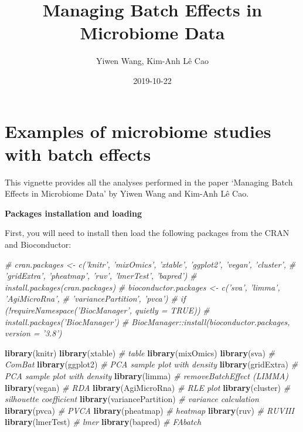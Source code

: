\documentclass[]{book}
\title{Managing Batch Effects in Microbiome Data}
\author{Yiwen Wang, Kim-Anh Lê Cao}
\date{2019-10-22}
\newenvironment{Shaded}{\begin{snugshade}}{\end{snugshade}}
\newcommand{\KeywordTok}[1]{\textcolor[rgb]{0.13,0.29,0.53}{\textbf{#1}}}
\newcommand{\CommentTok}[1]{\textcolor[rgb]{0.56,0.35,0.01}{\textit{#1}}}
\newcommand{\NormalTok}[1]{#1}
\begin{document}
\maketitle

{
\setcounter{tocdepth}{3}
\tableofcontents
}
\chapter{Examples of microbiome studies with batch
effects}\label{examples-of-microbiome-studies-with-batch-effects}

This vignette provides all the analyses performed in the paper `Managing
Batch Effects in Microbiome Data' by Yiwen Wang and Kim-Anh Lê Cao.

\textbf{Packages installation and loading}

First, you will need to install then load the following packages from
the CRAN and Bioconductor:

\begin{Shaded}
\begin{Highlighting}[]
\CommentTok{# cran.packages <- c('knitr', 'mixOmics', 'xtable', 'ggplot2', 'vegan', 'cluster',}
\CommentTok{#                   'gridExtra', 'pheatmap', 'ruv', 'lmerTest', 'bapred')}
\CommentTok{# install.packages(cran.packages)}
\CommentTok{# bioconductor.packages <- c('sva', 'limma', 'AgiMicroRna', }
\CommentTok{#                           'variancePartition', 'pvca')}
\CommentTok{# if (!requireNamespace('BiocManager', quietly = TRUE))}
\CommentTok{#     install.packages('BiocManager')}
\CommentTok{# BiocManager::install(bioconductor.packages, version = '3.8')}

\KeywordTok{library}\NormalTok{(knitr)}
\KeywordTok{library}\NormalTok{(xtable) }\CommentTok{# table}
\KeywordTok{library}\NormalTok{(mixOmics)}
\KeywordTok{library}\NormalTok{(sva) }\CommentTok{# ComBat}
\KeywordTok{library}\NormalTok{(ggplot2) }\CommentTok{# PCA sample plot with density}
\KeywordTok{library}\NormalTok{(gridExtra) }\CommentTok{# PCA sample plot with density}
\KeywordTok{library}\NormalTok{(limma) }\CommentTok{# removeBatchEffect (LIMMA)}
\KeywordTok{library}\NormalTok{(vegan) }\CommentTok{# RDA}
\KeywordTok{library}\NormalTok{(AgiMicroRna) }\CommentTok{# RLE plot}
\KeywordTok{library}\NormalTok{(cluster) }\CommentTok{# silhouette coefficient}
\KeywordTok{library}\NormalTok{(variancePartition) }\CommentTok{# variance calculation}
\KeywordTok{library}\NormalTok{(pvca) }\CommentTok{# PVCA}
\KeywordTok{library}\NormalTok{(pheatmap) }\CommentTok{# heatmap}
\KeywordTok{library}\NormalTok{(ruv) }\CommentTok{# RUVIII}
\KeywordTok{library}\NormalTok{(lmerTest) }\CommentTok{# lmer}
\KeywordTok{library}\NormalTok{(bapred) }\CommentTok{# FAbatch}
\end{Highlighting}
\end{Shaded}
\end{document}
